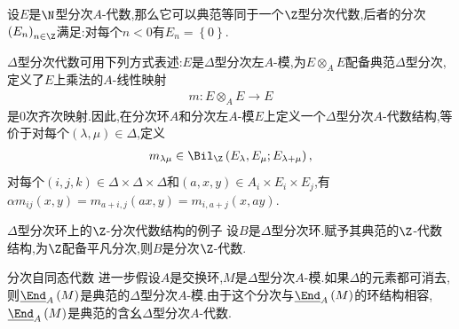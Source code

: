 \begin{remark}{}{}
	设$E$是$\N$型分次$A$-代数,那么它可以典范等同于一个$\Z$型分次代数,后者的分次$\left(E_{n}\right)_{n\in\Z}$满足:对每个$n<0$有$E_{n}=\left\{0\right\}$.
\end{remark}

\begin{remark}{}{}
	$\Delta$型分次代数可用下列方式表述:$E$是$\Delta$型分次左$A$-模,为$E\otimes_{A}E$配备典范$\Delta$型分次,定义了$E$上乘法的$A$-线性映射
	\begin{align*}
		m:E\otimes_{A}E\to E
	\end{align*}
	是$0$次齐次映射.因此,在分次环$A$和分次左$A$-模$E$上定义一个$\Delta$型分次$A$-代数结构,等价于对每个$\left(\lambda,\mu\right)\in\Delta$,定义
	\begin{align*}
		m_{\lambda\mu}\in\Bil_{\Z}\left(E_{\lambda},E_{\mu};E_{\lambda+\mu}\right),
	\end{align*}
	对每个$\left(i,j,k\right)\in\Delta\times\Delta\times\Delta$和$\left(a,x,y\right)\in A_{i}\times E_{i}\times E_{j}$,有$\alpha m_{ij}\left(x,y\right)=m_{a+i,j}\left(ax,y\right)=m_{i,a+j}\left(x,ay\right)$.
\end{remark}

\begin{example}{$\Delta$型分次环上的$\Z$-分次代数结构的例子}{}
	设$B$是$\Delta$型分次环.赋予其典范的$\Z$-代数结构,为$\Z$配备平凡分次,则$B$是分次$\Z$-代数.
\end{example}

\begin{example}{分次自同态代数}{}
	进一步假设$A$是交换环,$M$是$\Delta$型分次$A$-模.如果$\Delta$的元素都可消去,则$\underline{\End}_{A}\left(M\right)$是典范的$\Delta$型分次$A$-模.由于这个分次与$\underline{\End}_{A}\left(M\right)$的环结构相容,$\underline{\End}_{A}\left(M\right)$是典范的含幺$\Delta$型分次$A$-代数.
\end{example}

